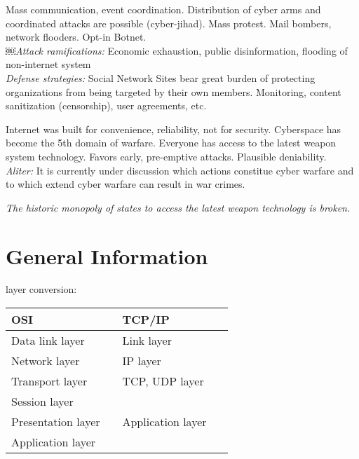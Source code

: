Mass communication, event coordination. Distribution of cyber arms and coordinated attacks are possible (cyber-jihad). Mass protest. Mail bombers, network flooders. Opt-in Botnet.\\
\textit{￼Attack ramifications:} Economic exhaustion, public disinformation, flooding of non-internet system \\
\textit{Defense strategies:} Social Network Sites bear great burden of protecting organizations from being targeted by their own members. Monitoring, content sanitization (censorship), user agreements, etc.

 Internet was built for convenience, reliability, not for security. Cyberspace has become the 5th domain of warfare. Everyone has access to the latest weapon system technology. Favors early, pre-emptive attacks. Plausible deniability. \\ \textit{Aliter:} It is currently under discussion which actions constitue cyber warfare and to which extend cyber warfare can result in war crimes.

\textit{The historic monopoly of states to access the latest weapon technology is broken.}

\section{General Information}

 layer conversion:

\begin{tabular}{|p{0.45\linewidth}|p{0.45\linewidth}|}
\hline
\textbf{OSI} & \textbf{TCP/IP} \\
\hline
\hline
Data link layer & Link layer \\
\hline
Network layer & IP layer \\
\hline
Transport layer & TCP, UDP layer \\
\hline
Session layer & \multirow{3}{*}{Application layer} \\
Presentation layer & \\
Application layer & \\
\hline
\end{tabular}